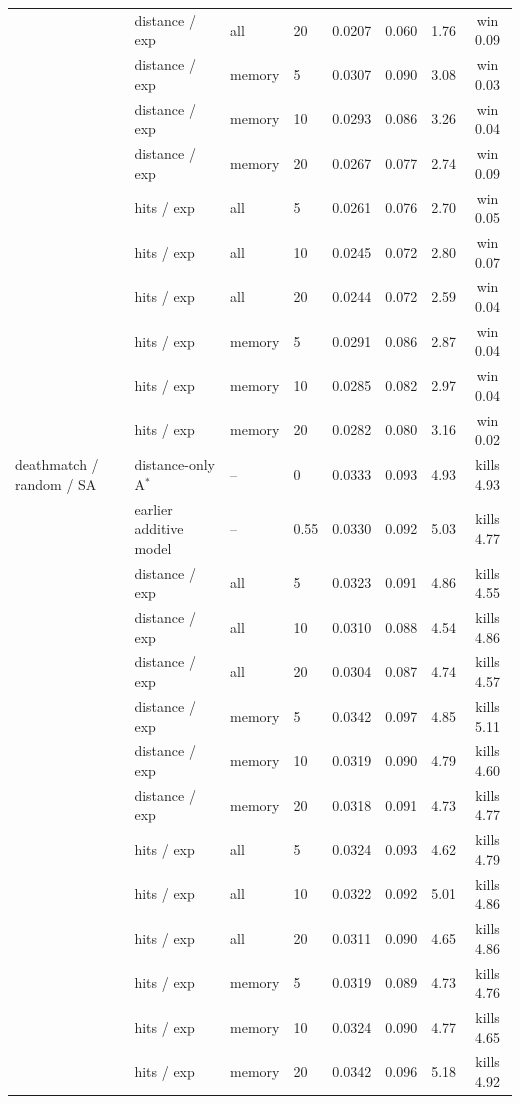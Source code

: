 \begin{tabular}{llllcccc}
 & distance / exp & all & 20 & 0.0207 & 0.060 & 1.76 & win 0.09 \\
 & distance / exp & memory & 5 & 0.0307 & 0.090 & 3.08 & win 0.03 \\
 & distance / exp & memory & 10 & 0.0293 & 0.086 & 3.26 & win 0.04 \\
 & distance / exp & memory & 20 & 0.0267 & 0.077 & 2.74 & win 0.09 \\
 & hits / exp & all & 5 & 0.0261 & 0.076 & 2.70 & win 0.05 \\
 & hits / exp & all & 10 & 0.0245 & 0.072 & 2.80 & win 0.07 \\
 & hits / exp & all & 20 & 0.0244 & 0.072 & 2.59 & win 0.04 \\
 & hits / exp & memory & 5 & 0.0291 & 0.086 & 2.87 & win 0.04 \\
 & hits / exp & memory & 10 & 0.0285 & 0.082 & 2.97 & win 0.04 \\
 & hits / exp & memory & 20 & 0.0282 & 0.080 & 3.16 & win 0.02 \\
\midrule
deathmatch / random / SA & distance-only A$^*$ & -- & 0 & 0.0333 & 0.093 & 4.93 & kills 4.93 \\
 & earlier additive model & -- & 0.55 & 0.0330 & 0.092 & 5.03 & kills 4.77 \\
 & distance / exp & all & 5 & 0.0323 & 0.091 & 4.86 & kills 4.55 \\
 & distance / exp & all & 10 & 0.0310 & 0.088 & 4.54 & kills 4.86 \\
 & distance / exp & all & 20 & 0.0304 & 0.087 & 4.74 & kills 4.57 \\
 & distance / exp & memory & 5 & 0.0342 & 0.097 & 4.85 & kills 5.11 \\
 & distance / exp & memory & 10 & 0.0319 & 0.090 & 4.79 & kills 4.60 \\
 & distance / exp & memory & 20 & 0.0318 & 0.091 & 4.73 & kills 4.77 \\
 & hits / exp & all & 5 & 0.0324 & 0.093 & 4.62 & kills 4.79 \\
 & hits / exp & all & 10 & 0.0322 & 0.092 & 5.01 & kills 4.86 \\
 & hits / exp & all & 20 & 0.0311 & 0.090 & 4.65 & kills 4.86 \\
 & hits / exp & memory & 5 & 0.0319 & 0.089 & 4.73 & kills 4.76 \\
 & hits / exp & memory & 10 & 0.0324 & 0.090 & 4.77 & kills 4.65 \\
 & hits / exp & memory & 20 & 0.0342 & 0.096 & 5.18 & kills 4.92 \\

\end{tabular}

